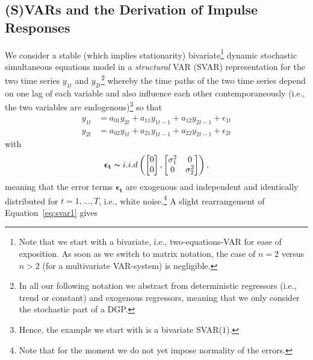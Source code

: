 \documentclass[a4paper,11pt,listof=nochaptergap,oneside,pointednumbers,bibtotoc,bigheadings,liststotoc,hidelinks]{scrbook}
\theoremstyle{mysatz}
\theoremstyle{mydefinition}
\theoremstyle{mytheorem}
\theoremstyle{mybemerkung}
\newcommand{\vect}[1]{\boldsymbol{\mathbf{#1}}}
\begin{document}
\label{sec:TheoreticalBackgroundSVARs}

\subsection{(S)VARs and the Derivation of Impulse Responses}
\label{sec:SVARsDerviationIRFs}
We consider a stable (which implies stationarity) bivariate\footnote{Note that we start with a bivariate, i.e., two-equations-VAR for ease of exposition. As soon as we switch to matrix notation, the case of $n=2$ versus $n>2$ (for a multivariate VAR-system) is negligible.} dynamic stochastic simultaneous equations model in a \textit{structural} VAR (SVAR) representation for the two time series $y_{1t}$ and $y_{2t}$\footnote{In all our following notation we abstract from deterministic regressors (i.e., trend or constant) and exogenous regressors, meaning that we only consider the stochastic part of a DGP.} whereby the time paths of the two time series depend on one lag of each variable and also influence each other contemporaneously (i.e., the two variables are endogenous)\footnote{Hence, the example we start with is a bivariate SVAR($1$).} so that
\begin{equation} \label{eq:svar1}
\begin{split}
	y_{1t} & = a_{01}y_{2t} + a_{11}y_{1t-1} + a_{12}y_{2t-1} + \epsilon_{1t} \\
	y_{2t} & = a_{02}y_{1t} + a_{21}y_{1t-1} + a_{22}y_{2t-1} + \epsilon_{2t}
\end{split}								
\end{equation}
with 
\begin{equation}
\begin{split}
	\vect{\epsilon_t} \thicksim i.i.d \left (  \begin{bmatrix}
    							0 \\
    							0
 							 \end{bmatrix}, \begin{bmatrix}
    							\sigma_{1}^2 & 0  \\
    							0 & \sigma_{2}^2
 							 \end{bmatrix} \right ),
\end{split}								
\end{equation}
meaning that the error terms $\vect{\epsilon_t}$ are exogenous and independent and identically distributed  for $t = 1, \dots, T$, i.e., white noise.\footnote{Note that for the moment we do not yet impose normality of the errors.} A slight rearrangement of Equation~\ref{eq:svar1} gives 
\end{document}
